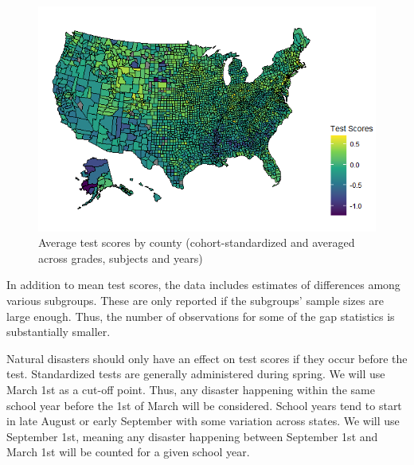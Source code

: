 \begin{figure}[!h]
	\centering
	\includegraphics[scale=0.7]{"../Code & Data/TestScoresMap.png"}
	\caption{Average test scores by county (cohort-standardized and averaged across grades, subjects and years)}
	\label{TestScoresMap}
\end{figure}

In addition to mean test scores, the data includes estimates of differences among various subgroups. These are only reported if the subgroups' sample sizes are large enough. Thus, the number of observations for some of the gap statistics is substantially smaller.

Natural disasters should only have an effect on test scores if they occur before the test. Standardized tests are generally administered during spring. We will use March 1st as a cut-off point. Thus, any disaster happening within the same school year before the 1st of March will be considered. School years tend to start in late August or early September with some variation across states. We will use September 1st, meaning any disaster happening between September 1st and March 1st will be counted for a given school year.







